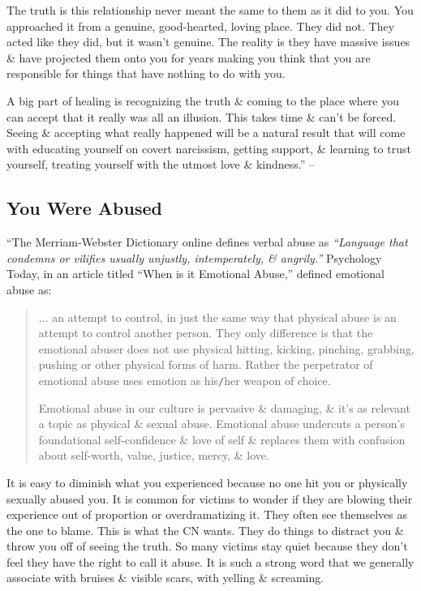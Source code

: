 \documentclass{article}
\numberwithin{equation}{section}
\begin{document}
The truth is this relationship never meant the same to them as it did to you. You approached it from a genuine, good-hearted, loving place. They did not. They acted like they did, but it wasn't genuine. The reality is they have massive issues \& have projected them onto you for years making you think that you are responsible for things that have nothing to do with you.

A big part of healing is recognizing the truth \& coming to the place where you can accept that it really was all an illusion. This takes time \& can't be forced. Seeing \& accepting what really happened will be a natural result that will come with educating yourself on covert narcissism, getting support, \& learning to trust yourself, treating yourself with the utmost love \& kindness.'' -- \cite[pp. 149--151]{Mirza2017}

\subsection{You Were Abused}
``The Merriam-Webster Dictionary online defines verbal abuse as \textit{``Language that condemns or vilifies usually unjustly, intemperately, \& angrily.''} Psychology Today, in an article titled ``When is it Emotional Abuse,'' defined emotional abuse as:
\begin{quotation}
	$\ldots$ an attempt to control, in just the same way that physical abuse is an attempt to control another person. They only difference is that the emotional abuser does not use physical hitting, kicking, pinching, grabbing, pushing or other physical forms of harm. Rather the perpetrator of emotional abuse uses emotion as his{\tt/}her weapon of choice.
	
	Emotional abuse in our culture is pervasive \& damaging, \& it's as relevant a topic as physical \& sexual abuse. Emotional abuse undercuts a person's foundational self-confidence \& love of self \& replaces them with confusion about self-worth, value, justice, mercy, \& love.
\end{quotation}
It is easy to diminish what you experienced because no one hit you or physically sexually abused you. It is common for victims to wonder if they are blowing their experience out of proportion or overdramatizing it. They often see themselves as the one to blame. This is what the CN wants. They do things to distract you \& throw you off of seeing the truth. So many victims stay quiet because they don't feel they have the right to call it abuse. It is such a strong word that we generally associate with bruises \& visible scars, with yelling \& screaming.
\end{document}
